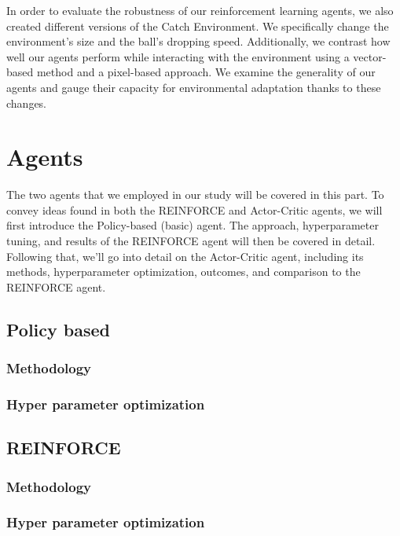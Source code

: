 \documentclass{article}
\begin{document}
    In order to evaluate the robustness of our reinforcement learning agents, we also created different versions of the Catch Environment.
    We specifically change the environment's size and the ball's dropping speed.
    Additionally, we contrast how well our agents perform while interacting with the environment using a vector-based method and a pixel-based approach.
    We  examine the generality of our agents and gauge their capacity for environmental adaptation thanks to these changes.
    
    \section{Agents}
    The two agents that we employed in our study will be covered in this part. 
    To convey ideas found in both the REINFORCE and Actor-Critic agents, we will first introduce the Policy-based (basic) agent.
    The approach, hyperparameter tuning, and results of the REINFORCE agent will then be covered in detail.
    Following that, we'll go into detail on the Actor-Critic agent, including its methods, hyperparameter optimization, outcomes, and comparison to the REINFORCE agent.
    
    \subsection{Policy based}
    \label{A-PolicyBased}
    
    \subsubsection{Methodology}
    \label{PB-Method}
    
    \subsubsection{Hyper parameter optimization}
    \label{PB-Method}
    
    
    \subsection{REINFORCE}
    \label{A-REINFORCE}
    
    \subsubsection{Methodology}
    \label{R-Method}
    
    \subsubsection{Hyper parameter optimization}
    \label{R-HPO}
    
\end{document}
